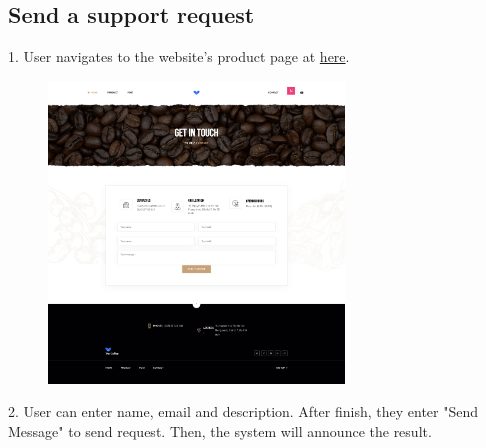 \subsection{Send a support request}
1. User navigates to the website's product page at \href{https://coffee.skrt.cc/support}{here}. \\
\begin{figure}[H]
    \centering
    \includegraphics[width=0.7\textwidth]{Demo/SupportPage.png}
    \label{fig:supportpage}
\end{figure}
2. User can enter name, email and description. After finish, they enter "Send Message" to send request. Then, the system will announce the result.
